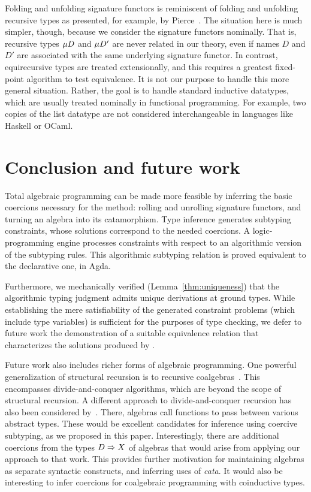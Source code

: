 \documentclass[runningheads]{llncs}
\begin{document}
Folding and unfolding signature functors is reminiscent of folding and
unfolding recursive types as presented, for example, by
Pierce~\cite{pierce02}.  The situation here is much simpler, though,
because we consider the signature functors nominally.  That is,
recursive types $\mu D$ and $\mu D'$ are never related in our
theory, even if names $D$ and $D'$ are associated with the same
underlying signature functor.  In contrast, equirecursive types are
treated extensionally, and this requires a greatest fixed-point
algorithm to test equivalence.  It is not our purpose to handle this
more general situation.  Rather, the goal is to handle standard
inductive datatypes, which are usually treated nominally in functional
programming.  For example, two copies of the list datatype are not
considered interchangeable in languages like Haskell or OCaml.

\section{Conclusion and future work} %

Total algebraic programming can be made more feasible by inferring the
basic coercions necessary for the method: rolling and unrolling
signature functors, and turning an algebra into its catamorphism.
Type inference generates subtyping constraints, whose solutions
correspond to the needed coercions.  A logic-programming engine
processes constraints with respect to an algorithmic version of the
subtyping rules.  This algorithmic subtyping relation is proved
equivalent to the declarative one, in Agda.

Furthermore, we mechanically verified (Lemma~\ref{thm:uniqueness}) that the
algorithmic typing judgment admits unique derivations at ground types. While
establishing the mere satisfiability of the generated constraint problems (which
include type variables) is sufficient for the purposes of type checking, we
defer to future work the demonstration of a suitable equivalence relation that
characterizes the solutions produced by .

Future work also includes richer forms of algebraic programming.  One
powerful generalization of structural recursion is to recursive
coalgebras~\cite{capretta+06}.  This encompasses divide-and-conquer
algorithms, which are beyond the scope of structural recursion.  A
different approach to divide-and-conquer recursion has also been
considered by~\cite{abreu+23}.  There, algebras call functions to
pass between various abstract types.  These would be excellent
candidates for inference using coercive subtyping, as we proposed in
this paper.  Interestingly, there are additional coercions from the
types $D \Rightarrow X$ of algebras that would arise from applying our
approach to that work.  This provides further motivation for
maintaining algebras as separate syntactic constructs, and inferring
uses of \textit{cata}.  It would also be interesting to infer
coercions for coalgebraic programming with coinductive types.
\end{document}
